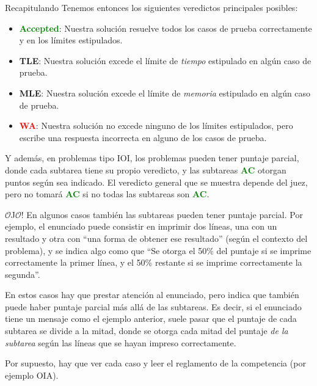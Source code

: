 \documentclass{beamer}
\begin{document}
    \begin{frame}{Recapitulando}
        Tenemos entonces los siguientes veredictos principales posibles: \pause

        \begin{itemize}
            \item \textbf{\textcolor{green}{Accepted}}: Nuestra solución resuelve todos los casos de prueba correctamente y en los límites estipulados.\pause
            \item \textbf{TLE}: Nuestra solución excede el límite de \textit{tiempo} estipulado en algún caso de prueba.\pause

            \item \textbf{MLE}: Nuestra solución excede el límite de \textit{memoria} estipulado en algún caso de prueba.\pause

            \item \textbf{\textcolor{red}{WA}}: Nuestra solución no excede ninguno de los límites estipulados, pero escribe una respuesta incorrecta en alguno de los casos de prueba. \pause
        \end{itemize}

        Y además, en problemas tipo IOI, los problemas pueden tener puntaje parcial, donde cada subtarea tiene su propio veredicto, y las subtareas \textbf{\textcolor{green}{AC}} otorgan puntos según sea indicado. El veredicto general que se muestra depende del juez, pero no tomará \textbf{\textcolor{green}{AC}} si no todas las subtareas son \textbf{\textcolor{green}{AC}}.
    \end{frame}

    \begin{frame}
        \begin{alertblock}{$\mathcal{O}$J$\mathcal{O}$!}
            \pause
            En algunos casos también las subtareas pueden tener puntaje parcial. Por ejemplo, el enunciado puede consistir en imprimir dos líneas, una con un resultado y otra con ``una forma de obtener ese resultado'' (según el contexto del problema), y se indica algo como que ``Se otorga el 50\% del puntaje si se imprime correctamente la primer línea, y el 50\% restante si se imprime correctamente la segunda''. \pause \vspace{4pt}

            En estos casos hay que prestar atención al enunciado, pero indica que también puede haber puntaje parcial más allá de las subtareas. Es decir, si el enunciado tiene un mensaje como el ejemplo anterior, suele pasar que el puntaje de cada subtarea se divide a la mitad, donde se otorga cada mitad del puntaje \textit{de la subtarea} según las líneas que se hayan impreso correctamente. 

            Por supuesto, hay que ver cada caso y leer el reglamento de la competencia (por ejemplo OIA).
        \end{alertblock}
    \end{frame}
\end{document}
